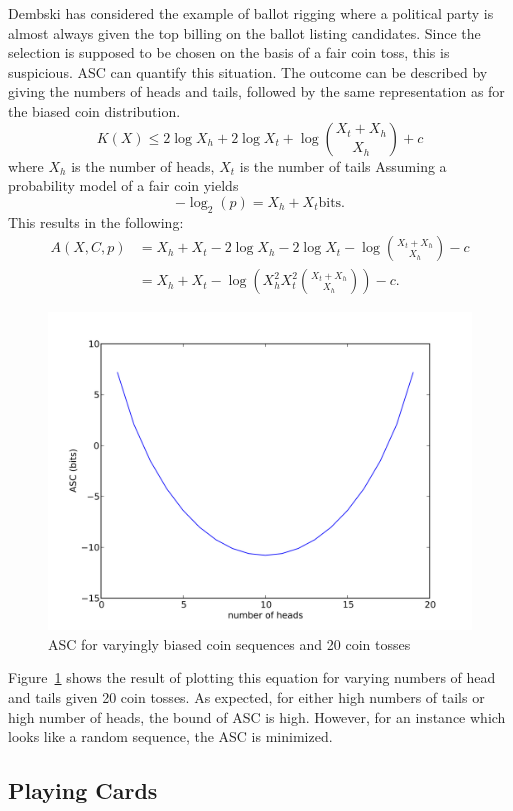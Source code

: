 Dembski \citep{Dembski1998} has considered the example of ballot rigging where a political party is almost always given the top billing on the ballot listing candidates.
Since the selection is supposed to be chosen on the basis of a fair coin toss, this is suspicious.
ASC can quantify this situation.
The outcome can be described by giving the numbers of heads and tails, followed by the same representation as for the biased coin distribution.
\begin{equation}
    K(X) \leq 2 \log X_h + 2 \log X_t + \log {X_t + X_h \choose X_h} + c
\end{equation} where $X_h$ is the number of heads, $X_t$ is the number of tails
Assuming a probability model of a fair coin yields
\begin{equation}
    -\log_2(p) = X_h + X_t \mbox{bits.}
\end{equation}
This results in the following:
\begin{align}
    A(X,C,p) &= X_h + X_t - 2 \log X_h -  2 \log X_t - \log {X_t + X_h \choose X_h} - c \nonumber \\
    &= X_h + X_t - \log \left( X_h^2 X_t^2 {X_t + X_h \choose X_h} \right) - c \mbox{.}
\end{align}
\begin{figure}
    \begin{center}
        \includegraphics[width=.5\textwidth]{EwertCoinPng.png}
    \end{center}
    \caption{ASC for varyingly biased coin sequences and 20 coin tosses}
    \label{fig_coins}
\end{figure}

\noindent Figure~\ref{fig_coins} shows the result of plotting this equation for varying numbers of head and tails given 20 coin tosses.
As expected, for either high numbers of tails or high number of heads, the bound of ASC is high.
However, for an instance which looks like a random sequence, the ASC is minimized.


\subsection{Playing Cards}

